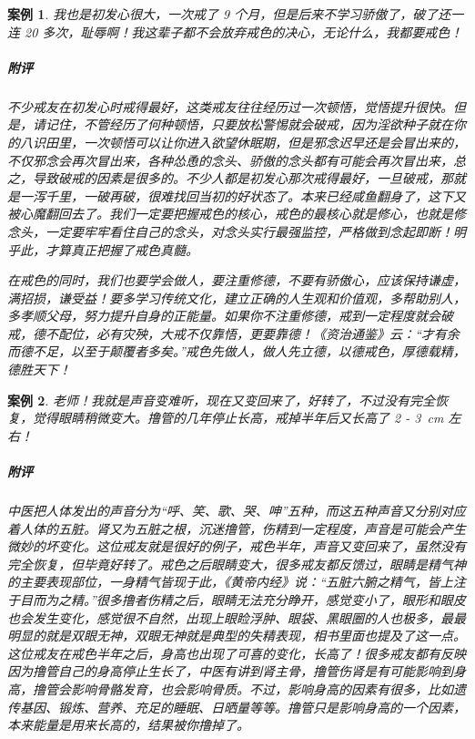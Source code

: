 \documentclass{ctexart}
\newtheorem{case}{案例}
\begin{document}
\begin{case}
    我也是初发心很大，一次戒了 9 个月，但是后来不学习骄傲了，破了还一连 20 多次，耻辱啊！我这辈子都不会放弃戒色的决心，无论什么，我都要戒色！
    \subparagraph{附评} 不少戒友在初发心时戒得最好，这类戒友往往经历过一次顿悟，觉悟提升很快。但是，请记住，不管经历了何种顿悟，只要放松警惕就会破戒，因为淫欲种子就在你的八识田里，一次顿悟可以让你进入欲望休眠期，但是邪念迟早还是会冒出来的，不仅邪念会再次冒出来，各种怂恿的念头、骄傲的念头都有可能会再次冒出来，总之，导致破戒的因素是很多的。不少人都是初发心那次戒得最好，一旦破戒，那就是一泻千里，一破再破，很难找回当初的好状态了。本来已经咸鱼翻身了，这下又被心魔翻回去了。我们一定要把握戒色的核心，戒色的最核心就是修心，也就是修念头，一定要牢牢看住自己的念头，对念头实行最强监控，严格做到念起即断！明乎此，才算真正把握了戒色真髓。

    在戒色的同时，我们也要学会做人，要注重修德，不要有骄傲心，应该保持谦虚，满招损，谦受益！要多学习传统文化，建立正确的人生观和价值观，多帮助别人，多孝顺父母，努力提升自身的正能量。如果你不注重修德，戒到一定程度就会破戒，德不配位，必有灾殃，大戒不仅靠悟，更要靠德！《资治通鉴》云：“才有余而德不足，以至于颠覆者多矣。”戒色先做人，做人先立德，以德戒色，厚德载精，德胜天下！
\end{case}

\begin{case}
    老师！我就是声音变难听，现在又变回来了，好转了，不过没有完全恢复，觉得眼睛稍微变大。撸管的几年停止长高，戒掉半年后又长高了 2 - \SI{3}{\centi\metre} 左右！
    \subparagraph{附评} 中医把人体发出的声音分为“呼、笑、歌、哭、呻”五种，而这五种声音又分别对应着人体的五脏。肾又为五脏之根，沉迷撸管，伤精到一定程度，声音是可能会产生微妙的坏变化。这位戒友就是很好的例子，戒色半年，声音又变回来了，虽然没有完全恢复，但毕竟好转了。戒色之后眼睛变大，很多戒友都反馈过，眼睛是精气神的主要表现部位，一身精气皆现于此，《黄帝内经》说：“五脏六腑之精气，皆上注于目而为之精。”很多撸者伤精之后，眼睛无法充分睁开，感觉变小了，眼形和眼皮也会发生变化，感觉很不自然，出现上眼睑浮肿、眼袋、黑眼圈的人也极多，最最明显的就是双眼无神，双眼无神就是典型的失精表现，相书里面也提及了这一点。这位戒友在戒色半年之后，身高也出现了可喜的变化，长高了！很多戒友都有反映因为撸管自己的身高停止生长了，中医有讲到肾主骨，撸管伤肾是有可能影响到身高，撸管会影响骨骼发育，也会影响骨质。不过，影响身高的因素有很多，比如遗传基因、锻炼、营养、充足的睡眠、日晒量等等。撸管只是影响身高的一个因素，本来能量是用来长高的，结果被你撸掉了。
\end{case}
\end{document}
